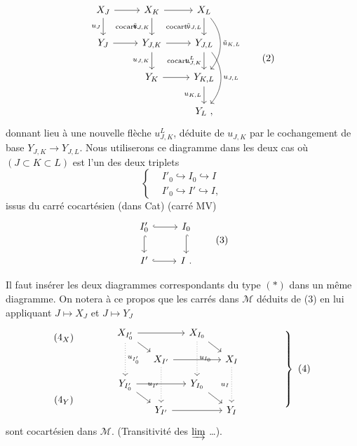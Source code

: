 \documentclass[11pt]{article}
\newcommand{\printedpage}[1]{\marginpar{\footnotesize p.~#1}}
\newcommand{\msp}[1]{\marginpar{\footnotesize [#1]}}
\newcommand{\cocart}{\text{\scriptsize cocart.}}
\begin{document}
\printedpage{9}
\[
\begin{tikzcd}
X_J \arrow[r] \arrow[d, "u_J"'] \arrow[dr, phantom, "\cocart"] & X_K \arrow[r] \arrow[d, "\tilde{u}_{J,K}"'] \arrow[dr, phantom, "\cocart"] & X_L \arrow[d, "\tilde{u}_{J,L}"'] \arrow[dd, bend left=40, "\tilde{u}_{K,L}"] \\
Y_J \arrow[r] & Y_{J,K} \arrow[r] \arrow[d, "u_{J,K}"'] \arrow[dr, phantom, "\cocart"] & Y_{J,L} \arrow[d, "u^L_{J,K}"'] \arrow[dd, bend left=40, "u_{J,L}"] \\
 & Y_K \arrow[r] & Y_{K,L} \arrow[d, "u_{K,L}"'] \\
 & & Y_L\ ,
\end{tikzcd}
\tag*{(2)}
\]
donnant lieu à une nouvelle flèche $u^L_{J,K}$, déduite de $u_{J,K}$ par le cochangement de base \msp{page 15} $Y_{J,K} \longrightarrow Y_{J,L}$. Nous utiliserons ce diagramme dans les deux cas où $(J \subset K \subset L)$ est l'un des deux triplets
\[
\left\{
\begin{aligned}
& I'_0 \hookrightarrow I_0 \hookrightarrow I \\
& I'_0 \hookrightarrow I' \hookrightarrow I,
\end{aligned}
\right.
\]
issus du carré cocartésien (dans Cat) (carré MV)
\[
\begin{tikzcd}
I'_0 \arrow[r, hook] \arrow[d, hook] & I_0 \arrow[d, hook] \\
I' \arrow[r, hook] & I\ .
\end{tikzcd}
\tag*{(3)}
\]

Il faut insérer les deux diagrammes correspondants du type $(*)$ dans un même diagramme. On notera à ce propos que les carrés dans $\mathcal{M}$ déduits de (3) en lui appliquant $J \longmapsto X_J$ et $J \longmapsto Y_J$
\[
\begin{matrix} (4_X) \\[12ex] (4_Y) \end{matrix}
\qquad\qquad
\begin{tikzcd}[column sep=small, row sep=small]
X_{I'_0} \arrow[rr] \arrow[dr] \arrow[dd, dotted, "u_{I'_0}"] & & X_{I_0} \arrow[dr] \arrow[dd, dotted, "u_{I_0}"] & \\
 & X_{I'} \arrow[rr] \arrow[dd, dotted, "u_{I'}"'] & & X_I \arrow[dd, dotted, "u_I"'] \\
Y_{I'_0} \arrow[rr] \arrow[dr] & & Y_{I_0} \arrow[dr] & \\
 & Y_{I'} \arrow[rr] & & Y_I
\end{tikzcd}
\qquad\qquad
\left.\vrule height 9ex depth 9ex width 0pt\right\}\ (4)
\]
sont cocartésien dans $\mathcal{M}$. (Transitivité des $\varinjlim$ \ldots). %
\end{document}
